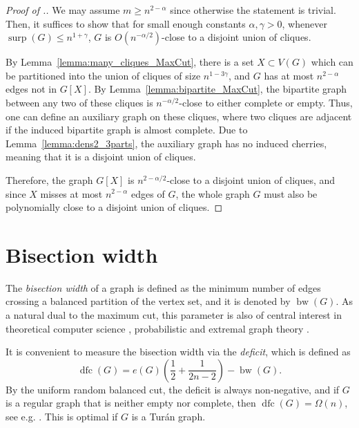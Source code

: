 \documentclass[11pt]{article}
\theoremstyle{plain}
\newtheorem{theorem}{Theorem}[section]
\theoremstyle{definition}
\DeclareMathOperator{\surp}{surp}
\DeclareMathOperator{\bw}{bw}
\DeclareMathOperator{\dfc}{dfc}
\newcommand{\eps}{\varepsilon}
\begin{document}
\begin{proof}[Proof of .]
We may assume $m \ge n^{2-\alpha}$ since otherwise the statement is trivial.
Then, it suffices to show that for small enough constants $\alpha, \gamma>0$, whenever $\surp(G)\leq n^{1+\gamma}$, $G$ is $O(n^{-\alpha/2})$-close to a disjoint union of cliques. 

By Lemma~\ref{lemma:many_cliques_MaxCut}, there is a set $X\subset V(G)$ which can be partitioned into the union of cliques of size $n^{1-3\gamma}$, and $G$ has at most $n^{2-\alpha}$ edges not in $G[X]$. By Lemma~\ref{lemma:bipartite_MaxCut}, the bipartite graph between any two of these cliques is $n^{-\alpha/2}$-close to either complete or empty. Thus, one can define an auxiliary graph on these cliques, where two cliques are adjacent if the induced bipartite graph is almost complete. Due to Lemma~\ref{lemma:dens2_3parts}, the auxiliary graph has no induced cherries, meaning that it is a disjoint union of cliques.

Therefore, the graph $G[X]$ is $n^{2-\alpha/2}$-close to a disjoint union of cliques, and since $X$ misses at most $n^{2-\alpha}$ edges of $G$, the whole graph $G$ must also be polynomially close to a disjoint union of cliques.
\end{proof}

\section{Bisection width}

The \emph{bisection width} of a graph is defined as the minimum number of edges crossing a balanced partition of the vertex set, and it is denoted by $\bw(G)$.
As a natural dual to the maximum cut, this parameter is also of central interest in theoretical computer science \cite{HLRW,HRW,Karger}, probabilistic \cite{BNP,DDSW,DMS, DSW} and extremal graph theory \cite{Alon93,RST,RT24}.

It is convenient to measure the bisection width via the \emph{deficit}, which is defined as 
$$\dfc(G)=e(G)\left(\frac{1}{2}+\frac{1}{2n-2}\right)-\bw(G).$$ By the uniform random balanced cut, the deficit is always non-negative, and if $G$ is a regular graph that is neither empty nor complete, then $\dfc(G)=\Omega(n)$, see e.g. \cite{RST}. This is optimal if $G$ is a Tur\'an graph.
\end{document}

